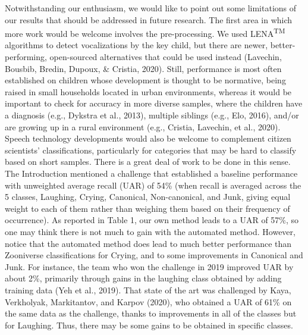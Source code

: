 \documentclass[english,,man]{apa6}
\begin{document}
Notwithstanding our enthusiasm, we would like to point out some limitations of our results that should be addressed in future research. The first area in which more work would be welcome involves the pre-processing. We used LENA\textsuperscript{TM} algorithms to detect vocalizations by the key child, but there are newer, better-performing, open-sourced alternatives that could be used instead (Lavechin, Bousbib, Bredin, Dupoux, \& Cristia, 2020). Still, performance is most often established on children whose development is thought to be normative, being raised in small households located in urban environments, whereas it would be important to check for accuracy in more diverse samples, where the children have a diagnosis (e.g., Dykstra et al., 2013), multiple siblings (e.g., Elo, 2016), and/or are growing up in a rural environment (e.g., Cristia, Lavechin, et al., 2020). Speech technology developments would also be welcome to complement citizen scientists' classifications, particularly for categories that may be hard to classify based on short samples. There is a great deal of work to be done in this sense. The Introduction mentioned a challenge that established a baseline performance with unweighted average recall (UAR) of 54\% (when recall is averaged across the 5 classes, Laughing, Crying, Canonical, Non-canonical, and Junk, giving equal weight to each of them rather than weighing them based on their frequency of occurrence). As reported in Table 1, our own method leads to a UAR of 57\%, so one may think there is not much to gain with the automated method. However, notice that the automated method does lead to much better performance than Zooniverse classifications for Crying, and to some improvements in Canonical and Junk. For instance, the team who won the challenge in 2019 improved UAR by about 2\%, primarily through gains in the laughing class obtained by adding training data (Yeh et al., 2019). That state of the art was challenged by Kaya, Verkholyak, Markitantov, and Karpov (2020), who obtained a UAR of 61\% on the same data as the challenge, thanks to improvements in all of the classes but for Laughing. Thus, there may be some gains to be obtained in specific classes.
\end{document}
